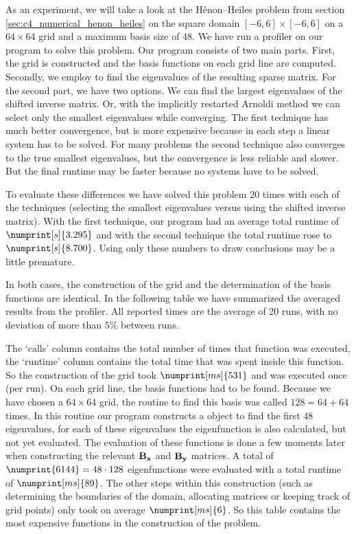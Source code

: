 As an experiment, we will take a look at the Hénon--Heiles problem from section \ref{sec:c4_numerical_henon_heiles} on the square domain $[-6 , 6]\times [-6, 6]$ on a $64\times 64$ grid and a maximum basis size of $48$. We have run a profiler on our program to solve this problem. Our program consists of two main parts. First, the grid is constructed and the basis functions on each grid line are computed. Secondly, we employ \spectra{} to find the eigenvalues of the resulting sparse matrix. For the second part, we have two options. We can find the largest eigenvalues of the shifted inverse matrix. Or, with the implicitly restarted Arnoldi method we can select only the smallest eigenvalues while converging. The first technique has much better convergence, but is more expensive because in each step a linear system has to be solved. For many problems the second technique also converges to the true smallest eigenvalues, but the convergence is less reliable and slower. But the final runtime may be faster because no systems have to be solved.

To evaluate these differences we have solved this problem 20 times with each of the techniques (selecting the smallest eigenvalues versus using the shifted inverse matrix). With the first technique, our program had an average total runtime of $\numprint[s]{3.295}$ and with the second technique the total runtime rose to $\numprint[s]{8.700}$. Using only these numbers to draw conclusions may be a little premature.

In both cases, the construction of the grid and the determination of the basis functions are identical. In the following table we have summarized the averaged results from the profiler. All reported times are the average of 20 runs, with no deviation of more than $5\%$ between runs.

\begin{center}
    
\end{center}

The `calls' column contains the total number of times that function was executed, the `runtime' column contains the total time that was spent inside this function. So the construction of the grid took $\numprint[ms]{531}$ and was executed once (per run). On each grid line, the basis functions had to be found. Because we have chosen a $64 \times 64$ grid, the routine to find this basis was called $128 = 64 + 64$ times. In this routine our program constructs a \matslise{} object to find the first $48$ eigenvalues, for each of these eigenvalues the eigenfunction is also calculated, but not yet evaluated. The evaluation of these functions is done a few moments later when constructing the relevant $\vb{B_x}$ and $\vb{B_y}$ matrices. A total of $\numprint{6144} = 48 \cdot 128$ eigenfunctions were evaluated with a total runtime of $\numprint[ms]{89}$. The other steps within this construction (such as determining the boundaries of the domain, allocating matrices or keeping track of grid points) only took on average $\numprint[ms]{6}$. So this table contains the most expensive functions in the construction of the problem.

